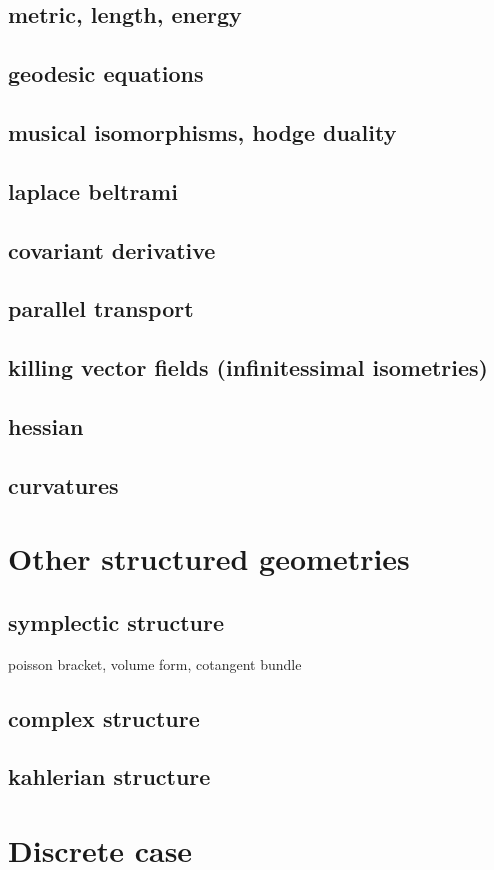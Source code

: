 
\subsection{metric, length, energy}

\subsection{geodesic equations}

\subsection{musical isomorphisms, hodge duality}

\subsection{laplace beltrami}

\subsection{covariant derivative}

\subsection{parallel transport}

\subsection{killing vector fields (infinitessimal isometries)}

\subsection{hessian}

\subsection{curvatures}


\clearpage
\section{Other structured geometries}

\subsection{symplectic structure}

poisson bracket, volume form, cotangent bundle

\subsection{complex structure}

\subsection{kahlerian structure}


\clearpage
\section{Discrete case}



